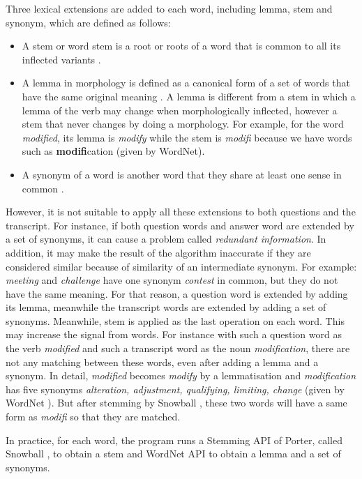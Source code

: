 Three lexical extensions are added to each word, including lemma, stem and synonym, which are defined as follows:
\begin{itemize}
\item {A stem or word stem is a root or roots of a word that is common to all its inflected variants \cite{Stem}.}
\item {A lemma in morphology is defined as a canonical form of a set of words that have the same original meaning \cite{clement2004mba}. A lemma is different from a stem in which a lemma of the verb may change when morphologically inflected, however a stem that never changes by doing a morphology. For example, for the word \textit{modified}, its lemma is \textit{modify} while the stem is \textit{modifi} because we have words such as \textbf{modifi}cation (given by WordNet\cite{miller1995wld}).}
\item {A synonym of a word is another word that they share at least one sense in common \cite{miller1995wld}.}
\end{itemize}

However, it is not suitable to apply all these extensions to both questions and the transcript. For instance, if both question words and answer word are extended by a set of synonyms, it can cause a problem called \textit{redundant information}. In addition, it may make the result of the algorithm inaccurate if they are considered similar because of similarity of an intermediate synonym. For example: \textit{meeting} and \textit{challenge} have one synonym \textit{contest} in common, but they do not have the same meaning. For that reason, a question word is extended by adding its lemma, meanwhile the transcript words are extended by adding a set of synonyms. Meanwhile, stem is applied as the last operation on each word. This may increase the signal from words. For instance with such a question word as the verb \textit{modified} and such a transcript word as the noun \textit{modification}, there are not any matching between these words, even after adding a lemma and a synonym.  In detail, \textit{modified} becomes \textit{modify} by a lemmatisation and \textit{modification} has five synonyms \textit{alteration, adjustment, qualifying, limiting, change} (given by WordNet \cite{pasca2001irw}). But after stemming by Snowball \cite{porter2001ss}, these two words will have a same form as \textit{modifi} so that they are matched.

In practice, for each word, the program runs a Stemming API of Porter, called Snowball \cite{porter2001ss}, to obtain a stem and WordNet API \cite{pasca2001irw} to obtain a lemma and a set of synonyms.

